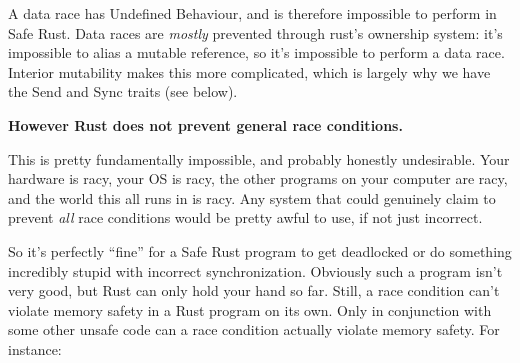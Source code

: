 \documentclass[a4paper,]{book}
\begin{document}
A data race has Undefined Behaviour, and is therefore impossible to
perform in Safe Rust. Data races are \emph{mostly} prevented through
rust's ownership system: it's impossible to alias a mutable reference,
so it's impossible to perform a data race. Interior mutability makes
this more complicated, which is largely why we have the Send and Sync
traits (see below).

\textbf{However Rust does not prevent general race conditions.}

This is pretty fundamentally impossible, and probably honestly
undesirable. Your hardware is racy, your OS is racy, the other programs
on your computer are racy, and the world this all runs in is racy. Any
system that could genuinely claim to prevent \emph{all} race conditions
would be pretty awful to use, if not just incorrect.

So it's perfectly ``fine'' for a Safe Rust program to get deadlocked or
do something incredibly stupid with incorrect synchronization. Obviously
such a program isn't very good, but Rust can only hold your hand so far.
Still, a race condition can't violate memory safety in a Rust program on
its own. Only in conjunction with some other unsafe code can a race
condition actually violate memory safety. For instance:
\end{document}
